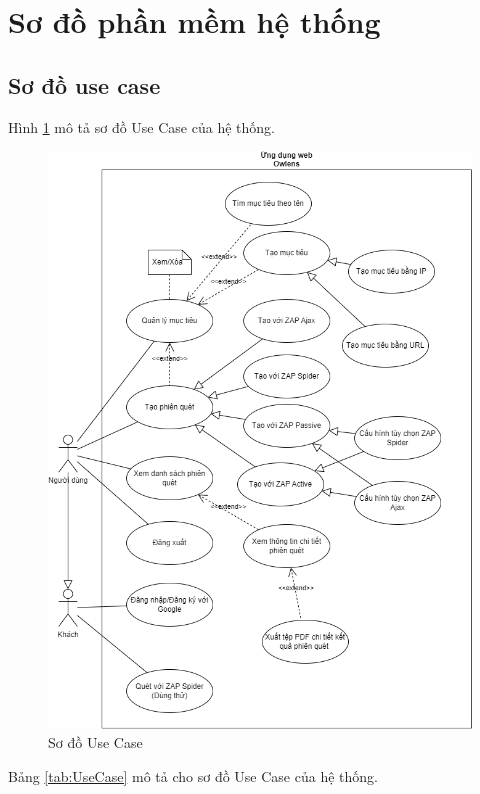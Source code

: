 \section{Sơ đồ phần mềm hệ thống}

\subsection{Sơ đồ use case}

\tab Hình \ref{fig:UseCase} mô tả sơ đồ Use Case của hệ thống.

\begin{figure}[H]
      \centering
      \includegraphics[width=\textwidth]{applied-thesis-chapters/chapter-3/Sơ đồ Use Case.png}
      \caption{Sơ đồ Use Case}
      \label{fig:UseCase}
\end{figure}

Bảng \ref{tab:UseCase} mô tả cho sơ đồ Use Case của hệ thống.

